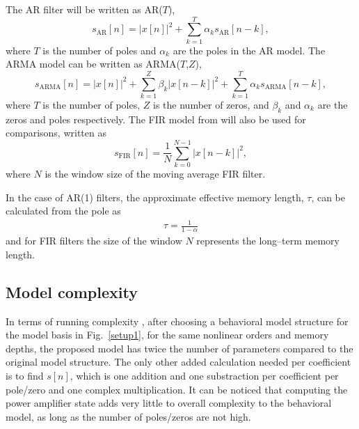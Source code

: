 \documentclass[journal]{IEEEtran}
\begin{document}
The AR filter will be written as AR($T$),
\begin{equation}
s_{\text{AR}}[n] = |x[n]|^2 + \sum_{k=1}^{T} \alpha_k s_{\text{AR}}[n-k], \label{AR}
\end{equation}
where $T$ is the number of poles and $\alpha_k$ are the poles in the AR model. The ARMA model can be written as ARMA($T$,$Z$),
\begin{equation}
s_{\text{ARMA}}[n] = |x[n]|^2 + \sum_{k=1}^{Z} \beta_k |x[n-k]|^2 + \sum_{k=1}^{T} \alpha_k s_{\text{ARMA}}[n-k], \label{ARMA}
\end{equation}
where $T$ is the number of poles, $Z$ is the number of zeros, and $\beta_k$ and $\alpha _k$ are the zeros and poles respectively. The FIR model from \cite{soltani2012} will also be used for comparisons, written as
\begin{equation}
s_{\text{FIR}}[n] = \frac{1}{N}\sum_{k=0}^{N-1} |x[n-k]|^2,
\label{FIR1}
\end{equation}
where $N$ is the window size of the moving average FIR filter.

In the case of AR(1) filters, the approximate effective memory length, $\tau$, can be calculated from the pole as
\begin{align}
\tau = \frac{1}{1-\alpha}
\end{align}
and for FIR filters the size of the window $N$ represents the long--term memory length.



\subsection{Model complexity}
In terms of running complexity \cite{soltani}, after choosing a behavioral model structure for the model basis in Fig.~\ref{setup1}, for the same nonlinear orders and memory depths, the proposed model has twice the number of parameters compared to the original model structure. The only other added calculation needed per coefficient is to find $s[n]$, which is one addition and one substraction per coefficient per pole/zero and one complex multiplication. It can be noticed that computing the power amplifier state adds very little to overall complexity to the behavioral model, as long as the number of poles/zeros are not high.
\end{document}
